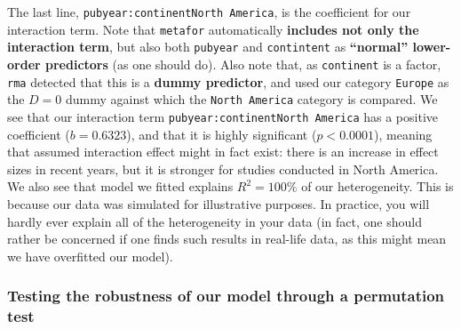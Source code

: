 \documentclass[]{book}
\begin{document}
The last line, \texttt{pubyear:continentNorth\ America}, is the coefficient for our interaction term. Note that \texttt{metafor} automatically \textbf{includes not only the interaction term}, but also both \texttt{pubyear} and \texttt{contintent} as \textbf{``normal'' lower-order predictors} (as one should do). Also note that, as \texttt{continent} is a factor, \texttt{rma} detected that this is a \textbf{dummy predictor}, and used our category \texttt{Europe} as the \(D=0\) dummy against which the \texttt{North\ America} category is compared. We see that our interaction term \texttt{pubyear:continentNorth\ America} has a positive coefficient (\(b=0.6323\)), and that it is highly significant (\(p<0.0001\)), meaning that assumed interaction effect might in fact exist: there is an increase in effect sizes in recent years, but it is stronger for studies conducted in North America. We also see that model we fitted explains \(R^2=100\%\) of our heterogeneity. This is because our data was simulated for illustrative purposes. In practice, you will hardly ever explain all of the heterogeneity in your data (in fact, one should rather be concerned if one finds such results in real-life data, as this might mean we have overfitted our model).

\hypertarget{testing-the-robustness-of-our-model-through-a-permutation-test}{%
\subsubsection{Testing the robustness of our model through a permutation test}\label{testing-the-robustness-of-our-model-through-a-permutation-test}}
\end{document}
